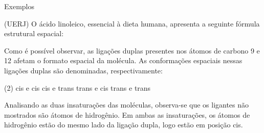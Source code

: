\documentclass[presentation,professionalfonts,aspectratio=169]{beamer}
\begin{document}
\begin{frame}[label={sec:org0d34ca6}]{Exemplos}
\begin{question}
(\alert{UERJ}) O ácido linoleico, essencial à dieta humana, apresenta a seguinte fórmula estrutural espacial:

{\scriptsize
\centering 
{}
}

Como é possível observar, as ligações duplas presentes nos átomos de carbono 9 e 12 afetam o formato espacial da molécula. As conformações espaciais nessas ligações duplas são denominadas, respectivamente:

\begin{choice}(2)
\choice cis e cis
\choice cis e trans
\choice trans e cis
\choice trans e trans
\end{choice}
\end{question}
\end{frame}

\begin{frame}[label={sec:orgc955176}]{}
\begin{answer}
Analisando as duas insaturações das moléculas, observa-se que os ligantes não mostrados são átomos de hidrogênio. Em ambas as insaturações, os átomos de hidrogênio estão do mesmo lado da ligação dupla, logo estão em posição \alert{cis}.

\end{answer}
\end{frame}
\end{document}
